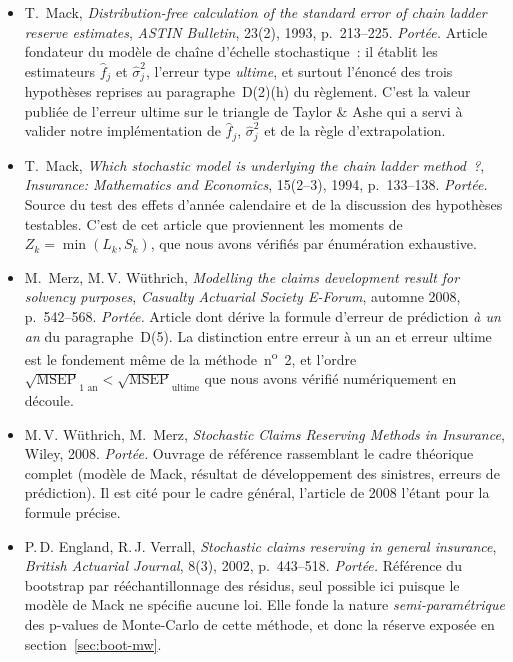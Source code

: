 \documentclass[a4paper,11pt]{article}
\begin{document}
\begin{itemize}[itemsep=4pt]
  \item T.~Mack, \emph{Distribution-free calculation of the standard error of
  chain ladder reserve estimates}, \emph{ASTIN Bulletin}, 23(2), 1993,
  p.~213--225.
  \emph{Portée.} Article fondateur du modèle de chaîne d'échelle stochastique~:
  il établit les estimateurs $\hat f_j$ et $\hat\sigma_j^2$, l'erreur type
  \emph{ultime}, et surtout l'énoncé des trois hypothèses reprises au
  paragraphe~D(2)(h) du règlement. C'est la valeur publiée de l'erreur ultime sur
  le triangle de Taylor \& Ashe qui a servi à valider notre implémentation de
  $\hat f_j$, $\hat\sigma_j^2$ et de la règle d'extrapolation.

  \item T.~Mack, \emph{Which stochastic model is underlying the chain ladder
  method~?}, \emph{Insurance: Mathematics and Economics}, 15(2--3), 1994,
  p.~133--138.
  \emph{Portée.} Source du test des effets d'année calendaire et de la
  discussion des hypothèses testables. C'est de cet article que proviennent les
  moments de $Z_k = \min(L_k, S_k)$, que nous avons vérifiés par énumération
  exhaustive.

  \item M.~Merz, M.\,V. Wüthrich, \emph{Modelling the claims development result
  for solvency purposes}, \emph{Casualty Actuarial Society E-Forum}, automne
  2008, p.~542--568.
  \emph{Portée.} Article dont dérive la formule d'erreur de prédiction \emph{à un
  an} du paragraphe~D(5). La distinction entre erreur à un an et erreur ultime
  est le fondement même de la méthode~n\textsuperscript{o}~2, et l'ordre
  $\sqrt{\mathrm{MSEP}}_{\text{1 an}} < \sqrt{\mathrm{MSEP}}_{\text{ultime}}$ que
  nous avons vérifié numériquement en découle.

  \item M.\,V. Wüthrich, M.~Merz, \emph{Stochastic Claims Reserving Methods in
  Insurance}, Wiley, 2008.
  \emph{Portée.} Ouvrage de référence rassemblant le cadre théorique complet
  (modèle de Mack, résultat de développement des sinistres, erreurs de
  prédiction). Il est cité pour le cadre général, l'article de 2008 l'étant pour
  la formule précise.

  \item P.\,D. England, R.\,J. Verrall, \emph{Stochastic claims reserving in
  general insurance}, \emph{British Actuarial Journal}, 8(3), 2002, p.~443--518.
  \emph{Portée.} Référence du bootstrap par rééchantillonnage des résidus, seul
  possible ici puisque le modèle de Mack ne spécifie aucune loi. Elle fonde la
  nature \emph{semi-paramétrique} des p-values de Monte-Carlo de cette méthode,
  et donc la réserve exposée en section~\ref{sec:boot-mw}.


\end{itemize}
\end{document}
